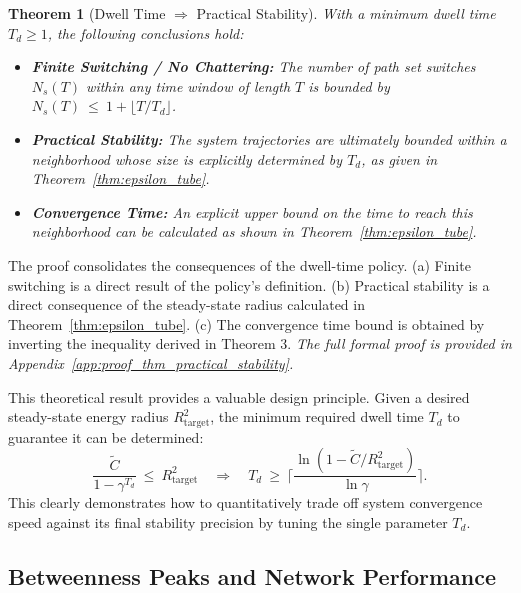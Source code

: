 \documentclass[journal]{IEEEtran}
\newtheorem{theorem}{Theorem}
\begin{document}
\begin{theorem}[Dwell Time $\Rightarrow$ Practical Stability]
\label{thm:practical_stability}
With a minimum dwell time $T_d \ge 1$, the following conclusions hold:
\begin{itemize}
    \item[\textit{(a)}] \textbf{Finite Switching / No Chattering:} The number of path set switches $N_s(T)$ within any time window of length $T$ is bounded by $N_s(T)\ \le\ 1+\lfloor T/T_d \rfloor$.
    \item[\textit{(b)}] \textbf{Practical Stability:} The system trajectories are ultimately bounded within a neighborhood whose size is explicitly determined by $T_d$, as given in Theorem~\ref{thm:epsilon_tube}.
    \item[\textit{(c)}] \textbf{Convergence Time:} An explicit upper bound on the time to reach this neighborhood can be calculated as shown in Theorem~\ref{thm:epsilon_tube}.
\end{itemize}
\end{theorem}
\begin{IEEEproof}
The proof consolidates the consequences of the dwell-time policy. (a) Finite switching is a direct result of the policy's definition. (b) Practical stability is a direct consequence of the steady-state radius calculated in Theorem~\ref{thm:epsilon_tube}. (c) The convergence time bound is obtained by inverting the inequality derived in Theorem 3. \textit{The full formal proof is provided in Appendix~\ref{app:proof_thm_practical_stability}.}
\end{IEEEproof}

This theoretical result provides a valuable design principle. Given a desired steady-state energy radius $R_{\text{target}}^2$, the minimum required dwell time $T_d$ to guarantee it can be determined:
\begin{equation}\label{eq:design_parameter_Td}
\frac{\tilde C}{1-\gamma^{T_d}}\ \le\ R_{\text{target}}^2
\quad\Longrightarrow\quad
T_d\ \ge\ \Big\lceil \frac{\ln(1-\tilde C/R_{\text{target}}^2)}{\ln \gamma}\Big\rceil.
\end{equation}
This clearly demonstrates how to quantitatively trade off system convergence speed against its final stability precision by tuning the single parameter $T_d$.

\subsection{Betweenness Peaks and Network Performance}
\label{subsec:theory_bridge}
\end{document}
